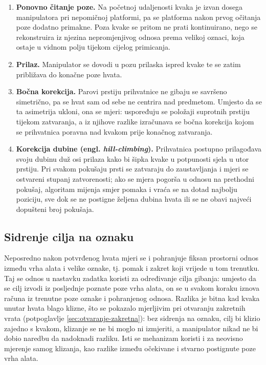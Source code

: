 \begin{enumerate}
      \item \textbf{Ponovno čitanje poze.} Na početnoj udaljenosti kvaka je izvan dosega
            manipulatora pri nepomičnoj platformi, pa se platforma nakon prvog očitanja poze
            dodatno primakne. Poza kvake se pritom ne prati kontinuirano, nego se rekonstruira iz
            njezina nepromjenjivog odnosa prema velikoj oznaci, koja ostaje u vidnom polju
            tijekom cijelog primicanja.
      \item \textbf{Prilaz.} Manipulator se dovodi u pozu prilaska ispred kvake te se zatim
            približava do konačne poze hvata.
      \item \textbf{Bočna korekcija.} Parovi prstiju prihvatnice ne gibaju se savršeno
            simetrično, pa se hvat sam od sebe ne centrira nad predmetom. Umjesto da se ta
            asimetrija ukloni, ona se mjeri: uspoređuju se položaji suprotnih prstiju tijekom
            zatvaranja, a iz njihove razlike izračunava se bočna korekcija kojom se prihvatnica
            poravna nad kvakom prije konačnog zatvaranja.
      \item \textbf{Korekcija dubine (engl. \textit{hill-climbing}).} Prihvatnica postupno
            prilagođava svoju dubinu duž osi prilaza kako bi šipka kvake u potpunosti sjela u
            utor prstiju. Pri svakom pokušaju prsti se zatvaraju do zaustavljanja i mjeri se
            ostvareni stupanj zatvorenosti; ako se mjera pogorša u odnosu na prethodni pokušaj,
            algoritam mijenja smjer pomaka i vraća se na dotad najbolju poziciju, sve dok se ne
            postigne željena dubina hvata ili se ne obavi najveći dopušteni broj pokušaja.
\end{enumerate}

\subsection{Sidrenje cilja na oznaku}
\label{sec:sidrenje}

Neposredno nakon potvrđenog hvata mjeri se i pohranjuje fiksan prostorni odnos između vrha
alata i velike oznake, tj. pomak i zakret koji vrijede u tom trenutku. Taj se odnos u nastavku
zadatka koristi za određivanje cilja gibanja: umjesto da se cilj izvodi iz posljednje poznate
poze vrha alata, on se u svakom koraku iznova računa iz trenutne poze oznake i pohranjenog
odnosa. Razlika je bitna kad kvaka unutar hvata blago klizne, što se pokazalo mjerljivim pri
otvaranju zakretnih vrata (potpoglavlje \ref{sec:otvaranje-zakretna}): bez sidrenja na oznaku,
cilj bi klizio zajedno s kvakom, klizanje se ne bi moglo ni izmjeriti, a manipulator nikad ne bi
dobio naredbu da nadoknadi razliku. Isti se mehanizam koristi i za neovisno mjerenje samog
klizanja, kao razlike između očekivane i stvarno postignute poze vrha alata.

